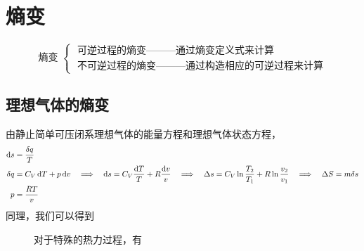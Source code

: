\section{熵变}
\begin{equation*}
	\mbox{熵变}\,\,
	\begin{cases}
		\,\,\mbox{可逆过程的熵变———通过熵变定义式来计算}\\
		\,\,\mbox{不可逆过程的熵变———通过构造相应的可逆过程来计算}
	\end{cases}
\end{equation*}
\vspace*{1em}
\subsection{理想气体的熵变}
由静止简单可压闭系理想气体的能量方程和理想气体状态方程，
\begin{align*}
{\rm{d}} s &= \dfrac{\delta q}{T}\\
\delta q &= C_V\,{\rm{d}} T + p \,{\rm{d}} v 
\quad \Longrightarrow \quad {\rm{d}} s = C_V \dfrac{{\rm{d}} T}{T} + R \dfrac{{\rm{d}} v}{v}
\quad \Longrightarrow \quad \Delta s = C_V \ln \dfrac{T_2}{T_1} + R \ln \dfrac{v_2}{v_1}
\quad \Longrightarrow \quad \Delta S = m \delta s \\
p &= \dfrac{RT}{v}
\end{align*}
同理，我们可以得到

\begin{table}[!htb]
	\centering{}
\end{table}

\begin{figure}[!htb]
	\noindent 对于特殊的热力过程，有
\end{figure}

